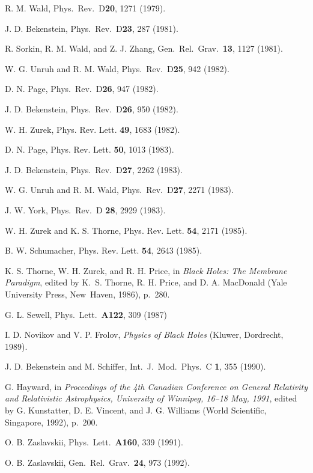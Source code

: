 \begin{thebibliography}{999}
 R. M. Wald, Phys.\ Rev.\ D{\bf 20}, 1271 (1979).

 J. D. Bekenstein, Phys.\ Rev.\ D{\bf 23}, 287 (1981).

 R. Sorkin, R. M. Wald, and Z. J. Zhang, Gen.\ Rel.\
Grav.\ {\bf 13}, 1127 (1981).

 W. G. Unruh and R. M. Wald, Phys.\ Rev.\ D{\bf 25},
942 (1982).

 D. N. Page, Phys.\ Rev.\ D{\bf 26}, 947 (1982).

 J. D. Bekenstein, Phys.\ Rev.\ D{\bf 26}, 950 (1982).

 W. H. Zurek, Phys. Rev. Lett. {\bf 49}, 1683 (1982).

 D. N. Page, Phys. Rev. Lett. {\bf 50}, 1013 (1983).

 J. D. Bekenstein, Phys.\ Rev.\ D{\bf 27}, 2262
(1983).

 W. G. Unruh and R. M. Wald, Phys.\ Rev.\ D{\bf 27},
2271
(1983).

 J. W. York, Phys.\ Rev.\ D {\bf 28}, 2929 (1983).

 W. H. Zurek and K. S. Thorne, Phys. Rev. Lett. {\bf
54},
2171
 (1985).

 B. W. Schumacher, Phys. Rev. Lett. {\bf 54}, 2643
(1985).

 K. S. Thorne, W. H. Zurek, and R. H. Price,
 in {\em Black Holes: The Membrane
 Paradigm}, edited by K.~S. Thorne, R. H. Price, and D. A. MacDonald
(Yale University Press, New~Haven, 1986), p.~280.

 G. L. Sewell, Phys.\ Lett.\ {\bf A122}, 309 (1987)

 I. D. Novikov and V. P. Frolov, {\em Physics of
Black
 Holes} (Kluwer, Dordrecht, 1989).

 J. D. Bekenstein and M. Schiffer, Int.\ J.\ Mod.\
Phys.\ C {\bf 1}, 355 (1990).

 G. Hayward, in {\em Proceedings of the 4th
Canadian Conference on General Relativity and Relativistic
Astrophysics, University of Winnipeg, 16--18 May, 1991},
edited by G. Kunstatter, D. E. Vincent, and J. G. Williams
(World Scientific, Singapore, 1992), p.~200.

 O. B. Zaslavskii, Phys.\ Lett.\ {\bf A160}, 339
(1991).

 O. B. Zaslavskii, Gen.\ Rel.\ Grav.\ {\bf 24}, 973
(1992).


\end{thebibliography}
